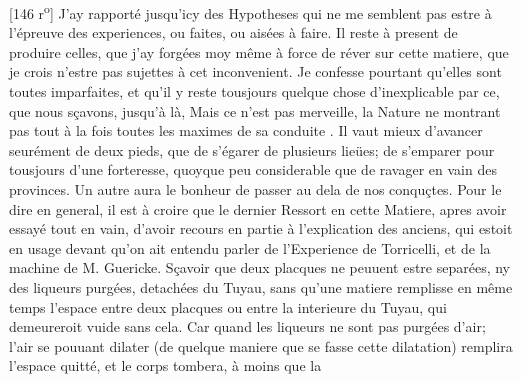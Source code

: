             [146 r\textsuperscript{o}] J'ay rapport\'{e}  jusqu'icy des Hypotheses qui ne me semblent pas estre \`{a} l'\'{e}preuve  des experiences, ou faites, ou ais\'{e}es \`{a} faire. Il reste \`{a} present de produire celles, que j'ay forg\'{e}es moy même \`{a} force de r\'{e}ver sur cette matiere, que je crois n'estre pas sujettes \`{a} cet inconvenient. Je confesse pourtant qu'elles sont toutes imparfaites, et qu'il y reste tousjours quelque chose d'inexplicable par ce, que nous s\c{c}avons, jusqu'\`{a} l\`{a},  Mais ce n'est pas merveille, la Nature ne montrant pas tout \`{a} la fois toutes les maximes de sa conduite . Il vaut  mieux d'avancer seur\'{e}ment de deux pieds, que de s'\'{e}garer de plusieurs lie\"{u}es; de s'emparer pour tousjours d'une forteresse, quoyque peu considerable que de ravager en vain des provinces. Un autre aura le bonheur de passer au dela de nos conqu\c{c}tes.\pend \pstart {} Pour le dire en general, il est \`{a} croire que  le dernier Ressort en cette Matiere, apres avoir essay\'{e} tout en vain, d'avoir recours en partie \`{a} l'explication des anciens, qui estoit en usage devant qu'on ait entendu parler de l'Experience\protect{}  de Torricelli\protect{}, et de la machine de M. Guericke\protect{}. S\c{c}avoir que deux placques ne peuuent estre separ\'{e}es,  ny des liqueurs purg\'{e}es\protect{}, detach\'{e}es du Tuyau, sans qu'une matiere remplisse en même temps l'espace entre deux placques ou entre la  interieure du Tuyau, qui demeureroit vuide sans cela. Car quand les liqueurs\protect{} ne sont pas purg\'{e}es d'air; l'air se pouuant dilater (de quelque maniere que se fasse cette dilatation) remplira l'espace  quitt\'{e}, et le corps tombera, \`{a} moins que la 